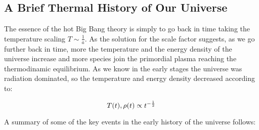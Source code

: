 \subsection{A Brief Thermal History of Our Universe}\label{ss:brief_thermal_history}

The essence of the hot Big Bang theory is simply to go back in time taking
the temperature scaling $T \sim \frac{1}{a}$. As the solution for the scale
factor suggests, as we go further back in time, more the temperature and
the energy density of the universe increase and more species join the
primordial plasma reaching the thermodinamic equilibrium. As we know in the
early stages the universe was radiation dominated, so the temperature and
energy density decreased according to:

\begin{equation}
        T\qty(t), \rho\qty(t) \propto t^{-\frac{1}{2}}         
\end{equation}

A summary of some of the key events in the early history of the universe
follows:


